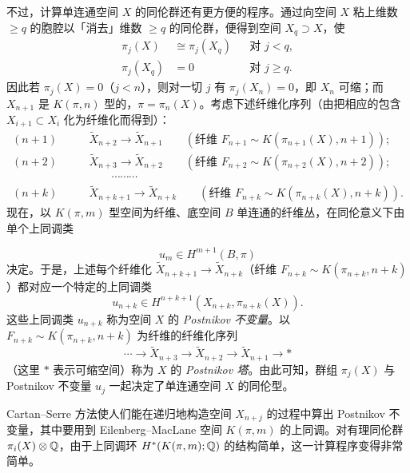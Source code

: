 不过，计算单连通空间 $X$ 的同伦群还有更方便的程序。通过向空间 $X$ 粘上维数 $\ge q$ 的胞腔以「消去」维数 $\ge q$ 的同伦群，便得到空间 $X_q\supset X$，使
\begin{equation}
\begin{aligned}
\pi_j(X)&\cong\pi_j(X_q) &&\text{对 } j<q,\\
\pi_j(X_q)&=0 &&\text{对 } j\ge q.
\end{aligned}
\tag{7.10}
\end{equation}
因此若 $\pi_j(X)=0$（$j<n$），则对一切 $j$ 有 $\pi_j(X_n)=0$，即 $X_n$ 可缩；而 $X_{n+1}$ 是 $K(\pi,n)$ 型的，$\pi=\pi_n(X)$。考虑下述纤维化序列（由把相应的包含 $X_{i+1}\subset X_i$ 化为纤维化而得到）：
\begin{align*}
(n+1)&\qquad \tilde X_{n+2}\longrightarrow\tilde X_{n+1}\qquad(\text{纤维 } F_{n+1}\sim K(\pi_{n+1}(X),n+1));\\
(n+2)&\qquad \tilde X_{n+3}\longrightarrow\tilde X_{n+2}\qquad(\text{纤维 } F_{n+2}\sim K(\pi_{n+2}(X),n+2));\\
&\qquad\qquad\cdots\cdots\cdots\\
(n+k)&\qquad \tilde X_{n+k+1}\longrightarrow\tilde X_{n+k}\qquad(\text{纤维 } F_{n+k}\sim K(\pi_{n+k}(X),n+k)).
\end{align*}
现在，以 $K(\pi,m)$ 型空间为纤维、底空间 $B$ 单连通的纤维丛，在同伦意义下由单个上同调类


\begin{equation*}
u_m\in H^{m+1}(B,\pi)
\end{equation*}
决定。于是，上述每个纤维化 $\tilde X_{n+k+1}\to\tilde X_{n+k}$（纤维 $F_{n+k}\sim K(\pi_{n+k},n+k)$）都对应一个特定的上同调类
\[
u_{n+k}\in H^{n+k+1}(X_{n+k},\pi_{n+k}(X)).
\]
这些上同调类 $u_{n+k}$ 称为空间 $X$ 的 \emph{Postnikov 不变量}。以 $F_{n+k}\sim K(\pi_{n+k},n+k)$ 为纤维的纤维化序列
\begin{equation}
\cdots\longrightarrow\tilde X_{n+3}\longrightarrow\tilde X_{n+2}\longrightarrow\tilde X_{n+1}\longrightarrow* \tag{7.11}
\end{equation}
（这里 $*$ 表示可缩空间）称为 $X$ 的 \emph{Postnikov 塔}。由此可知，群组 $\pi_j(X)$ 与 Postnikov 不变量 $u_j$ 一起决定了单连通空间 $X$ 的同伦型。

Cartan--Serre 方法使人们能在递归地构造空间 $X_{n+j}$ 的过程中算出 Postnikov 不变量，其中要用到 Eilenberg--MacLane 空间 $K(\pi,m)$ 的上同调。对有理同伦群 $\pi_i(X)\otimes\mathbb{Q}$，由于上同调环 $H^*(K(\pi,m);\mathbb{Q})$ 的结构简单，这一计算程序变得非常简单。

